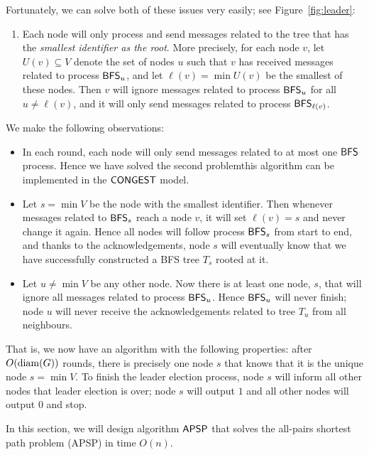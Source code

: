 Fortunately, we can solve both of these issues very easily; see Figure~\ref{fig:leader}:
\begin{enumerate}[resume]
    \item Each node will only process and send messages related to the tree that has the \emph{smallest identifier as the root}. More precisely, for each node $v$, let $U(v) \subseteq V$ denote the set of nodes $u$ such that $v$ has received messages related to process $\textup{\sffamily BFS}_u$, and let $\ell(v) = \min U(v)$ be the smallest of these nodes. Then $v$ will ignore messages related to process $\textup{\sffamily BFS}_u$ for all $u \ne \ell(v)$, and it will only send messages related to process $\textup{\sffamily BFS}_{\ell(v)}$.
\end{enumerate}
We make the following observations:
\begin{itemize}
    \item In each round, each node will only send messages related to at most one $\textup{\sffamily BFS}$ process. Hence we have solved the second problem\mydash this algorithm can be implemented in the $\textup{\sffamily CONGEST}$ model.
    \item Let $s = \min V$ be the node with the smallest identifier. Then whenever messages related to $\textup{\sffamily BFS}_s$ reach a node $v$, it will set $\ell(v) = s$ and never change it again. Hence all nodes will follow process $\textup{\sffamily BFS}_s$ from start to end, and thanks to the acknowledgements, node $s$ will eventually know that we have successfully constructed a BFS tree $T_s$ rooted at it.
    \item Let $u \ne \min V$ be any other node. Now there is at least one node, $s$, that will ignore all messages related to process $\textup{\sffamily BFS}_u$. Hence $\textup{\sffamily BFS}_u$ will never finish; node $u$ will never receive the acknowledgements related to tree $T_u$ from all neighbours.
\end{itemize}
That is, we now have an algorithm with the following properties: after $O(\operatorname{diam}(G))$ rounds, there is precisely one node $s$ that knows that it is the unique node $s = \min V$. To finish the leader election process, node $s$ will inform all other nodes that leader election is over; node $s$ will output $1$ and all other nodes will output $0$ and stop.


\label{sec:apsp}

In this section, we will design algorithm $\textup{\sffamily APSP}$ that solves the all-pairs shortest path problem (APSP) in time $O(n)$.


